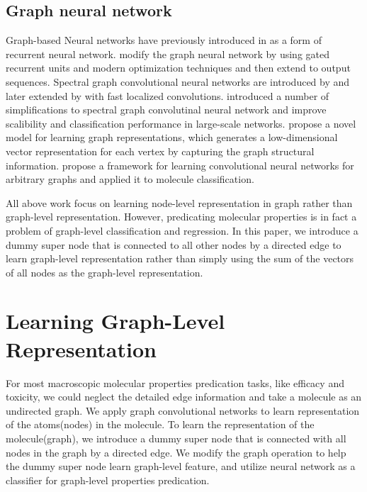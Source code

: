 \documentclass[letterpaper]{article} \usepackage{aaai18}  \usepackage{times}  \usepackage{helvet}  \usepackage{courier}  \usepackage{url}  \usepackage{graphicx}  \usepackage{amsmath}
\begin{document}
\subsection{Graph neural network}
Graph-based Neural networks have previously introduced in\cite{gori2005new,scarselli2009graph} as a form of recurrent neural network. \cite{li2015gated} modify the graph neural network by using gated recurrent units and modern optimization techniques and then extend to output sequences. Spectral graph convolutional neural networks are introduced by \cite{bruna2013spectral} and later extended by \cite{defferrard2016convolutional} with fast localized convolutions. \cite{kipf2016semi} introduced a number of simplifications to spectral graph convolutinal neural network and improve scalibility and classification performance in large-scale networks. \cite{cao2016deep} propose a novel model for learning graph representations, which generates a low-dimensional vector representation for each vertex by capturing the graph structural information. \cite{niepert2016learning} propose a framework for learning convolutional neural networks for arbitrary graphs and applied it to molecule classification. 

All above work focus on learning node-level representation in graph rather than graph-level representation. However, predicating molecular properties is in fact a problem of graph-level classification and regression. In this paper, we introduce a dummy super node that is connected to all other nodes by a directed edge to learn graph-level representation rather than simply using the sum of the vectors of all nodes as the graph-level representation\cite{duvenaud2015convolutional,altae2017low}.

\section{Learning Graph-Level Representation}
For most macroscopic molecular properties predication tasks, like efficacy and toxicity, we could neglect the detailed edge information and take a molecule as an undirected graph\cite{wu2017moleculenet}. We apply graph convolutional networks\cite{duvenaud2015convolutional} to learn representation of the atoms(nodes) in the molecule. To learn the representation of the molecule(graph), we introduce a dummy super node that is connected with all nodes in the graph by a directed edge. We modify the graph operation to help the dummy super node learn graph-level feature, and utilize neural network as a classifier for graph-level properties predication.
\end{document}
